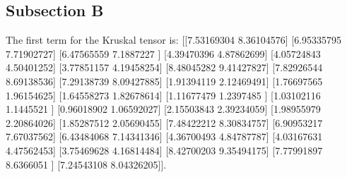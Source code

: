 \documentclass{article}%
\begin{document}
\subsection{Subsection B}%
\label{subsec:SubsectionB}%
The first term for the Kruskal tensor is: {[}{[}7.53169304 8.36104576{]}\newline%
 {[}6.95335795 7.71902727{]}\newline%
 {[}6.47565559 7.1887227 {]}\newline%
 {[}4.39470396 4.87862699{]}\newline%
 {[}4.05724843 4.50401252{]}\newline%
 {[}3.77851157 4.19458254{]}\newline%
 {[}8.48045282 9.41427827{]}\newline%
 {[}7.82926544 8.69138536{]}\newline%
 {[}7.29138739 8.09427885{]}\newline%
 {[}1.91394119 2.12469491{]}\newline%
 {[}1.76697565 1.96154625{]}\newline%
 {[}1.64558273 1.82678614{]}\newline%
 {[}1.11677479 1.2397485 {]}\newline%
 {[}1.03102116 1.1445521 {]}\newline%
 {[}0.96018902 1.06592027{]}\newline%
 {[}2.15503843 2.39234059{]}\newline%
 {[}1.98955979 2.20864026{]}\newline%
 {[}1.85287512 2.05690455{]}\newline%
 {[}7.48422212 8.30834757{]}\newline%
 {[}6.90953217 7.67037562{]}\newline%
 {[}6.43484068 7.14341346{]}\newline%
 {[}4.36700493 4.84787787{]}\newline%
 {[}4.03167631 4.47562453{]}\newline%
 {[}3.75469628 4.16814484{]}\newline%
 {[}8.42700203 9.35494175{]}\newline%
 {[}7.77991897 8.6366051 {]}\newline%
 {[}7.24543108 8.04326205{]}{]}.

%
\newpage%
\end{document}
